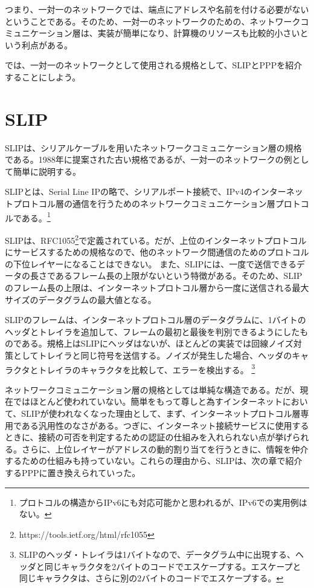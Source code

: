 つまり、一対一のネットワークでは、端点にアドレスや名前を付ける必要がないということである。そのため、一対一のネットワークのための、ネットワークコミュニケーション層は、実装が簡単になり、計算機のリソースも比較的小さいという利点がある。

では、一対一のネットワークとして使用される規格として、SLIPとPPPを紹介することにしよう。

\section{SLIP}

SLIPは、シリアルケーブルを用いたネットワークコミュニケーション層の規格である。1988年に提案された古い規格であるが、一対一のネットワークの例として簡単に説明する。

SLIPとは、Serial Line IPの略で、シリアルポート接続で、IPv4のインターネットプロトコル層の通信を行うためのネットワークコミュニケーション層プロトコルである。\footnote{プロトコルの構造からIPv6にも対応可能かと思われるが、IPv6での実用例はない。}

SLIPは、RFC1055\footnote{https://tools.ietf.org/html/rfc1055}で定義されている。だが、上位のインターネットプロトコルにサービスするための規格なので、他のネットワーク間通信のためのプロトコルの下位レイヤーになることはできない。
また、SLIPには、一度で送信できるデータの長さであるフレーム長の上限がないという特徴がある。そのため、SLIPのフレーム長の上限は、インターネットプロトコル層から一度に送信される最大サイズのデータグラムの最大値となる。

SLIPのフレームは、インターネットプロトコル層のデータグラムに、1バイトのヘッダとトレイラを追加して、フレームの最初と最後を判別できるようにしたものである。規格上はSLIPにヘッダはないが、ほとんどの実装では回線ノイズ対策としてトレイラと同じ符号を送信する。ノイズが発生した場合、ヘッダのキャラクタとトレイラのキャラクタを比較して、エラーを検出する。
\footnote{SLIPのヘッダ・トレイラは1バイトなので、データグラム中に出現する、ヘッダと同じキャラクタを2バイトのコードでエスケープする。エスケープと同じキャラクタは、さらに別の2バイトのコードでエスケープする。}

ネットワークコミュニケーション層の規格としては単純な構造である。だが、現在ではほとんど使われていない。簡単をもって尊しと為すインターネットにおいて、SLIPが使われなくなった理由として、まず、インターネットプロトコル層専用である汎用性のなさがある。つぎに、インターネット接続サービスに使用するときに、接続の可否を判定するための認証の仕組みを入れられない点が挙げられる。さらに、上位レイヤーがアドレスの動的割り当てを行うときに、情報を仲介するための仕組みも持っていない。これらの理由から、SLIPは、次の章で紹介するPPPに置き換えられていった。

